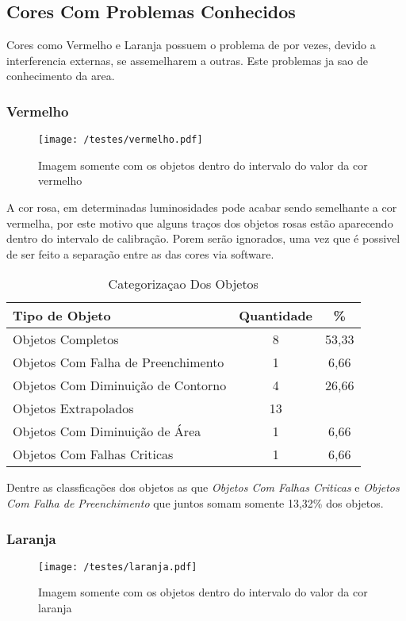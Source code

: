 \subsection{Cores Com Problemas Conhecidos}
Cores como Vermelho e Laranja possuem o problema de por vezes, devido a interferencia externas, se assemelharem a outras. Este problemas ja sao de conhecimento da area.
	
	
\subsubsection{Vermelho}
	\begin{figure}[H]
		\centering
		\texttt{[image: /testes/vermelho.pdf]}
		\caption{Imagem somente com os objetos dentro do intervalo do valor da cor vermelho}
		\label{disposicaoparte}
	\end{figure}

A cor rosa, em determinadas luminosidades pode acabar sendo semelhante a cor vermelha, por este motivo que alguns traços dos objetos rosas estão aparecendo dentro do intervalo de calibração. Porem serão ignorados, uma vez que é possivel de ser feito a separação entre as das cores via software.	

	
	\begin{table}[h]
\centering
\begin{tabular}{l|c|c}
Tipo de Objeto & Quantidade  & \% \\ %
\hline                               %
Objetos Completos &  8 & 53,33 \\
\hline 
Objetos Com Falha de Preenchimento & 1 & 6,66 \\
\hline 
Objetos Com Diminuição de Contorno &  4 & 26,66 \\
\hline 
Objetos Extrapolados &  13 \\
\hline 
Objetos Com Diminuição de Área &  1 &6,66 \\
\hline 
Objetos Com Falhas Criticas &  1 & 6,66\\
\hline 
\end{tabular}
\caption{Categorizaçao Dos Objetos}
\end{table}

Dentre as classficações dos objetos as que  \textit{Objetos Com Falhas Criticas} e \textit{Objetos Com Falha de Preenchimento} que juntos somam somente 13,32\% dos objetos.

\subsubsection{Laranja}
	\begin{figure}[H]
		\centering
		\texttt{[image: /testes/laranja.pdf]}
		\caption{Imagem somente com os objetos dentro do intervalo do valor da cor laranja}
		\label{disposicaoparte}
	\end{figure}
	
